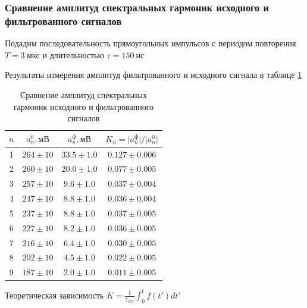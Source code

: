 \documentclass[a4paper, 12pt]{article}
\begin{document}
            \subsubsection{Сравнение амплитуд спектральных гармоник исходного и фильтрованного сигналов}

                Подадим последовательность прямоугольных импульсов с периодом повторения $T = 3~мкс$ и длительностью $\tau = 150~нс$

                Результаты измерения амплитуд фильтрованного и исходного сигнала в таблице \ref{tab:F.28}

                \begin{table}[!ht]
                    \centering
                    \begin{tabular}{|c|c|c|c|}
                        \hline

                        $n$ & $a_n^0, мВ$ & $a_n^ф, мВ$ & $K_n = \vert a_n^ф \vert / \vert a_n^0 \vert$\\ \hline
                        1 & $264 \pm 10$ & $33.5 \pm 1.0$ & $0.127 \pm 0.006$\\ \hline
                        2 & $260 \pm 10$ & $20.0 \pm 1.0$ & $0.077 \pm 0.005$\\ \hline
                        3 & $257 \pm 10$ & $9.6 \pm 1.0$ & $0.037 \pm 0.004$\\ \hline
                        4 & $247 \pm 10$ & $8.8 \pm 1.0$ & $0.036 \pm 0.004$\\ \hline
                        5 & $237 \pm 10$ & $8.8 \pm 1.0$ & $0.037 \pm 0.005$\\ \hline
                        6 & $227 \pm 10$ & $8.2 \pm 1.0$ & $0.036 \pm 0.005$\\ \hline
                        7 & $216 \pm 10$ & $6.4 \pm 1.0$ & $0.030 \pm 0.005$\\ \hline
                        8 & $202 \pm 10$ & $4.5 \pm 1.0$ & $0.022 \pm 0.005$\\ \hline
                        9 & $187 \pm 10$ & $2.0 \pm 1.0$ & $0.011 \pm 0.005$\\ \hline

                    \end{tabular}
                    \caption{Сравнение амплитуд спектральных гармоник исходного и фильтрованного сигналов}
                    \label{tab:F.28}
                \end{table}

                Теоретическая зависимость $K = \frac{1}{\tau_{RC}} \int_0^t f(t')dt'$
\end{document}
